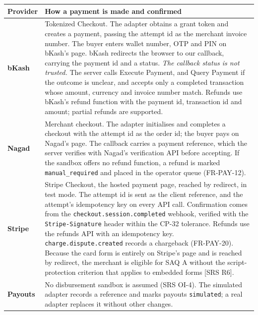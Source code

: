 \documentclass[11pt,a4paper]{article}
\newenvironment{dtable}[1]{\small\begin{longtable}{#1}}{\end{longtable}}
\begin{document}
\begin{dtable}{@{}>{\bfseries}p{1.6cm}>{\raggedright\arraybackslash}p{13.6cm}@{}}
\toprule
\textnormal{\textbf{Provider}} & \textbf{How a payment is made and confirmed} \\ \midrule \endhead
bKash & Tokenized Checkout. The adapter obtains a grant token and creates a payment, passing the attempt id as the merchant invoice number. The buyer enters wallet number, OTP and PIN on bKash's page. bKash redirects the browser to our callback, carrying the payment id and a status. \emph{The callback status is not trusted.} The server calls Execute Payment, and Query Payment if the outcome is unclear, and accepts only a completed transaction whose amount, currency and invoice number match. Refunds use bKash's refund function with the payment id, transaction id and amount; partial refunds are supported. \\
Nagad & Merchant checkout. The adapter initialises and completes a checkout with the attempt id as the order id; the buyer pays on Nagad's page. The callback carries a payment reference, which the server verifies with Nagad's verification API before accepting. If the sandbox offers no refund function, a refund is marked \texttt{manual\_required} and placed in the operator queue (FR-PAY-12). \\
Stripe & Stripe Checkout, the hosted payment page, reached by redirect, in test mode. The attempt id is sent as the client reference, and the attempt's idempotency key on every API call. Confirmation comes from the \texttt{checkout.session.completed} webhook, verified with the \texttt{Stripe-Signature} header within the CP-32 tolerance. Refunds use the refunds API with an idempotency key. \texttt{charge.dispute.created} records a chargeback (FR-PAY-20). Because the card form is entirely on Stripe's page and is reached by redirect, the merchant is eligible for SAQ A without the script-protection criterion that applies to embedded forms [SRS R6]. \\
Payouts & No disbursement sandbox is assumed (SRS OI-4). The simulated adapter records a reference and marks payouts \texttt{simulated}; a real adapter replaces it without other changes. \\
\bottomrule
\end{dtable}
\end{document}
